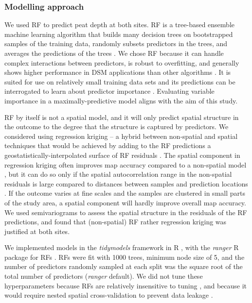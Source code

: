 \documentclass[soil, manuscript]{copernicus}
\begin{document}
\subsubsection{Modelling approach}

We used RF to predict peat depth at both sites.
RF is a tree-based ensemble machine learning algorithm that builds many decision trees on bootstrapped samples of the training data, randomly subsets predictors in the trees, and averages the predictions of the trees \citep{breimanRandomForests2001}.
We chose RF because it can handle complex interactions between predictors, is robust to overfitting, and generally shows higher performance in DSM applications than other algorithms \citep{beguinPredictingSoilProperties2017, nussbaumEvaluationDigitalSoil2018, lamichhaneDigitalSoilMapping2019}.
It is suited for use on relatively small training data sets and its predictions can be interrogated to learn about predictor importance \citep{khaledianSelectingAppropriateMachine2020}.
Evaluating variable importance in a maximally-predictive model aligns with the aim of this study.

RF by itself is not a spatial model, and it will only predict spatial structure in the outcome to the degree that the structure is captured by predictors.
We considered using regression kriging -- a hybrid between non-spatial and spatial techniques that would be achieved by adding to the RF predictions a geostatistically-interpolated surface of RF residuals \citep{henglGenericFrameworkSpatial2004}.
The spatial component in regression kriging often improves map accuracy compared to a non-spatial model \citep{beguinPredictingSoilProperties2017, lamichhaneDigitalSoilMapping2019, mollaMachineLearningGeostatistical2023}, but it can do so only if the spatial autocorrelation range in the non-spatial residuals is large compared to distances between samples and prediction locations \citep{henglGenericFrameworkSpatial2004, szaboMappingSoilHydraulic2019, takoutsingComparingPredictionPerformance2022}.
If the outcome varies at fine scales and the samples are clustered in small parts of the study area, a spatial component will hardly improve overall map accuracy.
We used semivariograms to assess the spatial structure in the residuals of the RF predictions, and found that (non-spatial) RF rather regression kriging was justified at both sites.

We implemented models in the \emph{tidymodels} framework in R \citep{kuhnTidymodelsCollectionPackages2020}, with the \emph{ranger} R package for RFs \citep[v.0.16,][]{wrightRangerFastImplementation2017}.
RFs were fit with 1000 trees, minimum node size of 5, and the number of predictors randomly sampled at each split was the square root of the total number of predictors (\emph{ranger} default).
We did not tune these hyperparameters because RFs are relatively insensitive to tuning \citep{probstHyperparametersTuningStrategies2019}, and because it would require nested spatial cross-validation to prevent data leakage \citep{schratzHyperparameterTuningPerformance2019}.
\end{document}
